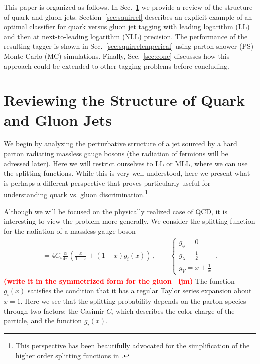 \documentclass[letterpaper,11pt]{article}
\DeclareRobustCommand{\Sec}[1]{Sec.~\ref{#1}}
\newcommand{\ijm}[1]{\marginpar{\raggedright\scriptsize\textbf{\textcolor{red}{ijm}}}  \textbf{\textcolor{red}{(#1 --ijm)}}}
\begin{document}
This paper is organized as follows. In \Sec{sec:structure} we provide a review of the structure of quark and gluon jets. Section~\ref{sec:squirrel} describes an explicit example of an optimal classifier for quark versus gluon jet tagging with leading logarithm (LL) and then at next-to-leading logarithm (NLL) precision.  The performance of the resulting tagger is shown in Sec.~\ref{sec:squirrelemperical} using parton shower (PS) Monte Carlo (MC) simulations.  Finally, Sec.~\ref{sec:conc} discusses how this approach could be extended to other tagging problems before concluding.




\section{Reviewing the Structure of Quark and Gluon Jets}
\label{sec:structure}

We begin by analyzing the perturbative structure of a jet sourced by a hard parton radiating massless gauge bosons (the radiation of fermions will be adressed later). Here we will restrict ourselves to LL or MLL, where we can use the splitting functions. While this is very well understood, here we present what is perhaps a different perspective that proves particularly useful for understanding quark vs. gluon discrimination.\footnote{This perspective has been beautifully advocated for the simplification of the higher order splitting functions in \cite{Dokshitzer:2005bf,Dokshitzer:2006nm,Beccaria:2007bb}.}


Although we will be focused on the physically realized case of QCD, it is interesting to view the problem more generally. We consider the splitting function for the radiation of a massless gauge boson
\begin{align}\label{eq:split_general}
=4C_i \frac{\alpha}{4\pi} \left(\frac{x}{1-x}+(1-x) g_i(x)   \right)\,, \qquad \left\{ \begin{array}{c}g_\phi=0 \\ g_\lambda=\frac{1}{2} \\g_V=x+\frac{1}{x} \end{array} \right. \,.
\end{align}
\ijm{write it in the symmetrized form for the gluon}
The function $g_i(x)$ satisfies the condition that it has a regular Taylor series expansion about $x=1$. Here we see that the splitting probability depends on the parton species through two factors: the Casimir $C_i$ which describes the color charge of the particle, and the function $g_i(x)$.
\end{document}

